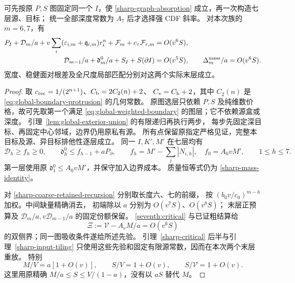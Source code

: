 \begin{lemma}[同一族的两个前缀]\label{seventh:priors}
可先按原 \(P,S\) 图固定同一个 \(I\)，使
\eqref{sharp-graph-absorption} 成立，再一次构造七层源、目标；
统一全部深度常数为 \(A_7\) 后才选择强 CDF 斜率。
对本次族的 \(m=6,7\)，有
\begin{align}
 P_I+\mathcal D_m/a+
 v\sum_i(\varepsilon_{i,m}+\mathfrak q_{i,m})r_i^n
 +\mathcal F_m+c_\tau\mathcal F_{\tau,m}&=O(v^6S),
 \label{seventh:positive-prior}\\
 \mathcal D_{m-1}/a+\mathfrak d_m^0/a+S_I+S(\partial I)&=O(v^5S),
 \qquad \Delta_m^{\rm mass}/a=O(v^6S).
 \label{seventh:mass-prior}
\end{align}
宽度、稳健面对根差及全尺度局部匹配分别对这两个实际末层成立。
\end{lemma}
\begin{proof}
取 \(c_{\rm rec}=1/(2^{n+1})\)、\(C_{\rm b}=2C_2(n)+2\)、
\(C_*=C_{\rm b}+2\)，其中 \(C_2(n)\) 是
\eqref{eq:global-boundary-protrusion} 的几何常数。
原图选层只依赖 \(P,S\) 及纯维数价格，故可先取第一个满足
\eqref{eq:global-weighted-boundary} 的图层；它不依赖源盒或深度。
引理~\ref{lem:global-exterior-union} 的有限递归再执行两步，
每步先固定深目标、再固定中心邻域，边界仍用原私有源。
所有点保留原指定严格见证，完整本目标及源、异目标排他性逐层成立。
同一 \(I,K',M'\) 在七层均有
\begin{equation}\label{seventh:depth}
 \mathcal D_h\ge f_h\ge0,\qquad
 \mathfrak d_h^0\le f_{h-1}+aP_\partial,\qquad
 f_h=M'-\sum_i|N_{i,h}|,\quad f_0=A_0vM',\qquad 1\le h\le7.
\end{equation}
第一层使用原 \(\mathfrak d_1^0\le A_0vM'\)，并保守加入边界成本。
质量恒等式仍为 \eqref{sharp-mass-identity}。

对 \eqref{sharp-coarse-retained-recursion} 分别取长度六、七的前缀，
按 \((b_0v/c_0)^{m-h}\) 加权。中间缺量精确消去，
初端除以 \(a\) 分别为 \(O(v^7S)\)、\(O(v^8S)\)；
末层正预算及 \(\mathcal D_m/a,v\mathcal D_{m-1}/a\) 的固定份额保留。
\eqref{seventh:critical} 与已证粗结算给
\[
 \Xi:=\mathcal V-A_vM/a=O(v^6S)
\]
的双侧界；同一图吸收条件遂给所述先验。
引理~\ref{sharp-critical} 后半与引理~\ref{sharp-input-tiling}
只使用这些先验和固定有限源常数，因而在本次两个末层重放。
特别
\begin{equation}\label{seventh:mass-leading}
 M/V=a[1+O(v)],\qquad S/V=1+O(v),\qquad S/\mathcal V=1+O(v).
\end{equation}
这里用原精确 \(M/a\le S\le V/(1-a)\)，没有以 \(aS\) 替代 \(M\)。
\end{proof}

